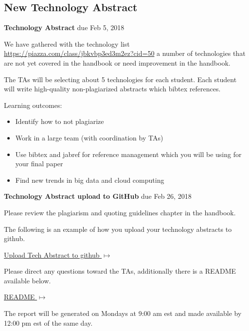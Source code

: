 \subsection{New Technology Abstract}
\label{E:616-new-tech-abstract}

\begin{exercise} {\bf Technology Abstract} due Feb 5, 2018

We have gathered with the technology list
\url{https://piazza.com/class/jbkvbp3ed3m2ez?cid=50} a number of
technologies that are not yet covered in the handbook or
need improvement in the handbook.


The TAs will be selecting about 5 technologies for each student. Each
student will write high-quality non-plagiarized abstracts which bibtex
references.
 
Learning outcomes:

\begin{itemize}

\item Identify how to not plagiarize
\item Work in a large team (with coordination by TAs)
\item Use bibtex and jabref for reference management which you will be using for your final paper
\item Find new trends in big data and cloud computing

\end{itemize}

\end{exercise}

\begin{exercise}{\bf Technology Abstract upload to GitHub} due Feb 26,
  2018


Please review the plagiarism and quoting guidelines chapter in the
handbook.


The following is an example of how you upload your technology
abstracts to github.
\smallskip

{\hfill \href{https://github.com/cloudmesh-community/hid-sample/tree/master/technology}{Upload
    Tech Abstract to github $\mapsto$}}

\smallskip

Please direct any questions toward the TAs, additionally there is a
README available below. 

{\hfill
  \href{https://github.com/cloudmesh-community/hid-sample/blob/master/technology/README.md}{README
    $\mapsto$}}

\smallskip

The report will be generated on Mondays at 9:00 am est and made
available by 12:00 pm est of the same day.
\smallskip


\end{exercise}

